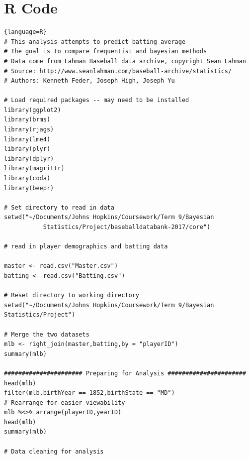 \documentclass[10pt,a4paper]{article}
\begin{document}
\section*{R Code}
\begin{lstlisting}{language=R}
# This analysis attempts to predict batting average
# The goal is to compare frequentist and bayesian methods
# Data come from Lahman Baseball data archive, copyright Sean Lahman
# Source: http://www.seanlahman.com/baseball-archive/statistics/
# Authors: Kenneth Feder, Joseph High, Joseph Yu

# Load required packages -- may need to be installed
library(ggplot2)
library(brms)
library(rjags)
library(lme4)
library(plyr)
library(dplyr) 
library(magrittr)
library(coda)
library(beepr)

# Set directory to read in data
setwd("~/Documents/Johns Hopkins/Coursework/Term 9/Bayesian 
           Statistics/Project/baseballdatabank-2017/core") 

# read in player demographics and batting data

master <- read.csv("Master.csv")
batting <- read.csv("Batting.csv")

# Reset directory to working directory
setwd("~/Documents/Johns Hopkins/Coursework/Term 9/Bayesian 
Statistics/Project")

# Merge the two datasets
mlb <- right_join(master,batting,by = "playerID")
summary(mlb)

###################### Preparing for Analysis ######################
head(mlb)
filter(mlb,birthYear == 1852,birthState == "MD")
# Rearrange for easier viewability
mlb %<>% arrange(playerID,yearID)
head(mlb)
summary(mlb)

# Data cleaning for analysis


\end{lstlisting}
\end{document}
